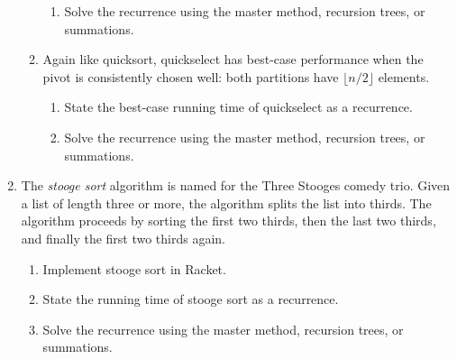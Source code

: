 \documentclass{article}
\begin{document}
\begin{enumerate}
\begin{enumerate}
\begin{enumerate}
    \item Solve the recurrence using the master method, recursion trees, or
      summations.
    \end{enumerate}
  \item
    Again like quicksort, quickselect has best-case performance when the pivot
    is consistently chosen well: both partitions have \(\lfloor{n/2}\rfloor\)
    elements.
    \begin{enumerate}
    \item State the best-case running time of quickselect as a recurrence.
    \item Solve the recurrence using the master method, recursion trees, or
      summations.
    \end{enumerate}
  \end{enumerate}

  \pagebreak[2]
\item
  The \emph{stooge sort} algorithm is named for the Three Stooges comedy trio.
  Given a list of length three or more, the algorithm splits the list into
  thirds.  The algorithm proceeds by sorting the first two thirds, then the last
  two thirds, and finally the first two thirds again.
  \begin{enumerate}
  \item Implement stooge sort in Racket.
  \item State the running time of stooge sort as a recurrence.
  \item Solve the recurrence using the master method, recursion trees, or
    summations.
  \end{enumerate}


\end{enumerate}
\end{document}

